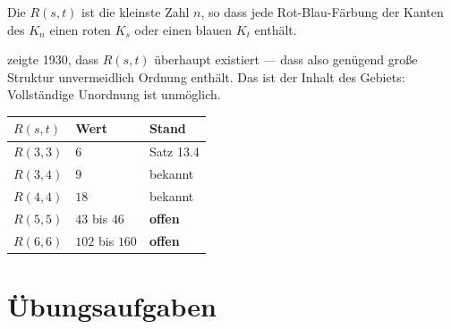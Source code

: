\begin{merksatz}
Die  $R(s,t)$ ist die kleinste Zahl $n$, so dass jede Rot-Blau-Färbung der Kanten des $K_n$ einen roten $K_s$ oder einen blauen $K_t$ enthält.

 zeigte 1930, dass $R(s,t)$ überhaupt existiert --- dass also  genügend große Struktur unvermeidlich Ordnung enthält. Das ist der Inhalt des Gebiets: Vollständige Unordnung ist unmöglich.

\begin{center}
{\small
\renewcommand{\arraystretch}{1.45}
\begin{tabular}{@{}P{1.8cm}P{2.2cm}P{3.4cm}@{}}
\toprule
$R(s,t)$ & \textbf{Wert} & \textbf{Stand}\\
\midrule
$R(3,3)$ & $6$ & \textcolor{gruen}{Satz 13.4}\\
$R(3,4)$ & $9$ & \textcolor{gruen}{bekannt}\\
$R(4,4)$ & $18$ & \textcolor{gruen}{bekannt}\\
$R(5,5)$ & $43$ bis $46$ & \textcolor{akzent}{\textbf{offen}}\\
$R(6,6)$ & $102$ bis $160$ & \textcolor{akzent}{\textbf{offen}}\\
\bottomrule
\end{tabular}}
\end{center}

\begin{center}
\begin{minipage}{0.88\textwidth}
\end{minipage}
\end{center}
\end{merksatz}

\section{Übungsaufgaben}

